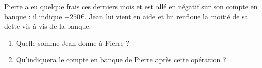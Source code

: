 
\begin{exercice}\label{exosmath-0745}

    Pierre a eu quelque frais ces derniers mois et est allé en négatif sur son compte en banque : il indique \( -250\)€. Jean lui vient en aide et lui renfloue la moitié de sa dette vis-à-vis de la banque.

    \begin{enumerate}
        \item
            
    Quelle somme Jean donne à Pierre ?
\item
    Qu'indiquera le compte en banque de Pierre après cette opération ?
    \end{enumerate}

\end{exercice}
